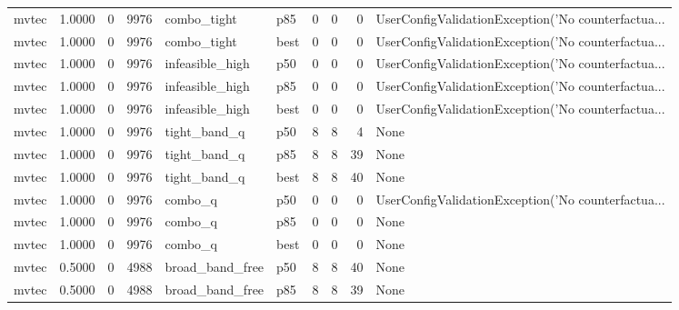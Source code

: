\begin{tabular}{lrrrllrrrl}
   mvtec &    1.0000 &    0 &   9976 &          combo\_tight &    p85 &               0 &          0 &       0 & UserConfigValidationException('No counterfactua... \\
   mvtec &    1.0000 &    0 &   9976 &          combo\_tight &   best &               0 &          0 &       0 & UserConfigValidationException('No counterfactua... \\
   mvtec &    1.0000 &    0 &   9976 &      infeasible\_high &    p50 &               0 &          0 &       0 & UserConfigValidationException('No counterfactua... \\
   mvtec &    1.0000 &    0 &   9976 &      infeasible\_high &    p85 &               0 &          0 &       0 & UserConfigValidationException('No counterfactua... \\
   mvtec &    1.0000 &    0 &   9976 &      infeasible\_high &   best &               0 &          0 &       0 & UserConfigValidationException('No counterfactua... \\
   mvtec &    1.0000 &    0 &   9976 &         tight\_band\_q &    p50 &               8 &          8 &       4 &                                               None \\
   mvtec &    1.0000 &    0 &   9976 &         tight\_band\_q &    p85 &               8 &          8 &      39 &                                               None \\
   mvtec &    1.0000 &    0 &   9976 &         tight\_band\_q &   best &               8 &          8 &      40 &                                               None \\
   mvtec &    1.0000 &    0 &   9976 &              combo\_q &    p50 &               0 &          0 &       0 & UserConfigValidationException('No counterfactua... \\
   mvtec &    1.0000 &    0 &   9976 &              combo\_q &    p85 &               0 &          0 &       0 &                                               None \\
   mvtec &    1.0000 &    0 &   9976 &              combo\_q &   best &               0 &          0 &       0 &                                               None \\
   mvtec &    0.5000 &    0 &   4988 &      broad\_band\_free &    p50 &               8 &          8 &      40 &                                               None \\
   mvtec &    0.5000 &    0 &   4988 &      broad\_band\_free &    p85 &               8 &          8 &      39 &                                               None \\

\end{tabular}
